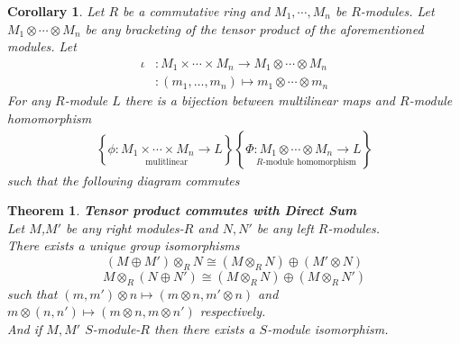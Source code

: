 \documentclass{article}
\theoremstyle{plain}
\newtheorem{thm}{Theorem}[section]
\newtheorem{cor}{Corollary}[section]
\theoremstyle{definition}
\theoremstyle{remark}
\begin{document}
  \begin{cor}
    Let $R$ be a commutative ring and $M_1,\cdots,M_n$ be $R$-modules.
    Let $M_1\otimes\cdots\otimes M_n$ be any bracketing of the tensor 
    product of the aforementioned modules. Let
    \begin{align*}
      \iota&:M_1\times\cdots\times M_n\to M_1\otimes\cdots\otimes M_n \\
           &:(m_1,\ldots,m_n)\mapsto m_1\otimes\cdots\otimes m_n
    \end{align*}
    For any $R$-module $L$ there is a bijection
    between multilinear maps and $R$-module homomorphism
    \begin{align*}
      \left\{\underset{\text{ mulitlinear}}{\phi:M_1\times\cdots\times M_n\to L}\right\}
      \left\{\underset{\text{ $R$-module homomorphism}}{\Phi:M_1\otimes\cdots\otimes M_n\to L}\right\}
    \end{align*}
    such that the following diagram commutes
    
\begin{center}\end{center}
  \end{cor}
  \begin{thm}\textbf{Tensor product commutes with Direct Sum}\\
    Let $M$,$M'$ be any right modules-$R$ and $N,N'$ be any
    left $R$-modules.\\[1em]
    There exists a unique group isomorphisms
    \[(M\oplus M')\otimes_R N\cong(M\otimes_RN)\oplus(M'\otimes N)\]
    \[ M\otimes_R(N\oplus N')\cong(M\otimes_RN)\oplus(M\otimes_RN') \]
    such that $(m,m')\otimes n \mapsto (m\otimes n,m'\otimes n)$ and
    $m\otimes(n,n')\mapsto(m\otimes n,m\otimes n')$ respectively.
    \\[1em]
    And if $M,M'$ $S$-module-$R$ then there exists a $S$-module isomorphism.
  \end{thm}
\end{document}
